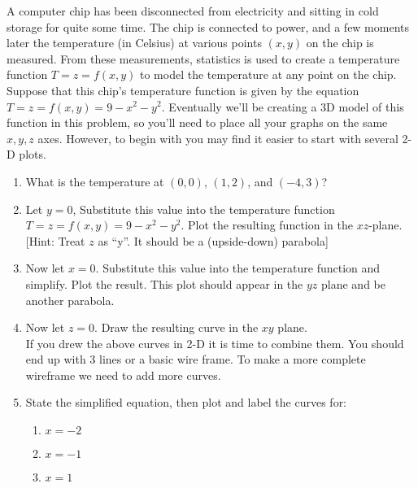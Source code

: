 \begin{problem}\label{prob:3dsurface plot}
%
%
 A computer chip has been disconnected from electricity and sitting in cold storage for quite some time.  The chip is connected to power, and a few moments later the temperature (in Celsius) at various points $(x,y)$ on the chip is measured. From these measurements, statistics is used to create a temperature function $T=z=f(x,y)$ to model the temperature at any point on the chip. Suppose that this chip's temperature function is given by the equation $T=z=f(x,y)=9-x^2-y^2$. Eventually we'll be creating a 3D model of this function in this problem, so you'll need to place all your graphs on the same $x,y,z$ axes. However, to begin with you may find it easier to start with several 2-D plots.
\begin{enumerate}
	\item What is the temperature at $(0,0)$, $(1,2)$, and $(-4,3)$? 
	\item Let $y=0$, Substitute this value into the temperature function $T=z=f(x,y)=9-x^2-y^2$. Plot the resulting function in the $xz$-plane. [Hint: Treat $z$ as ``y''. It should be a (upside-down) parabola]
	\item Now let $x=0$. Substitute this value into the temperature function and simplify. Plot the result. This plot should appear in the $yz$ plane and be another parabola.
	\item Now let $z=0$. Draw the resulting curve in the $xy$ plane.\\
	If you drew the above curves in 2-D it is time to combine them. You should end up with 3 lines or a basic wire frame. To make a more complete wireframe we need to add more curves.
	\item State the simplified equation, then plot and label the curves for:
	\begin{enumerate}
		\item $x=-2$
		\item $x=-1$
		\item $x=1$

\end{enumerate}
\end{enumerate}
\end{problem}
